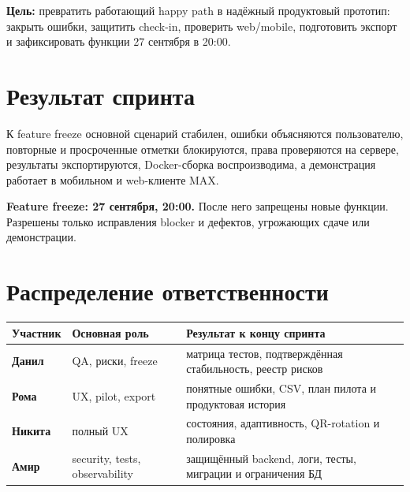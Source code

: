\documentclass[11pt,a4paper]{article}
\begin{document}
\begin{titlepage}\pagecolor{MaxPurple}\color{white}\par{}\par\vspace{9mm}{\Large 26-27 сентября 2026}\par\vfill
\begin{tcolorbox}[colback=white,colframe=white,arc=3mm,boxrule=0pt]\color{Ink}\textbf{Цель:} превратить работающий happy path в надёжный продуктовый прототип: закрыть ошибки, защитить check-in, проверить web/mobile, подготовить экспорт и зафиксировать функции 27 сентября в 20:00.\end{tcolorbox}\vspace{8mm}{\large Команда: Данил, Рома, Никита, Амир}\par\end{titlepage}\nopagecolor\color{Ink}

\section{Результат спринта}
\begin{goalbox}
К feature freeze основной сценарий стабилен, ошибки объясняются пользователю, повторные и просроченные отметки блокируются, права проверяются на сервере, результаты экспортируются, Docker-сборка воспроизводима, а демонстрация работает в мобильном и web-клиенте MAX.
\end{goalbox}
\begin{alertbox}\textbf{Feature freeze: 27 сентября, 20:00.} После него запрещены новые функции. Разрешены только исправления blocker и дефектов, угрожающих сдаче или демонстрации.\end{alertbox}

\section{Распределение ответственности}
\begin{tabularx}{\textwidth}{>{\bfseries}p{25mm}p{34mm}X}\toprule
Участник & Основная роль & Результат к концу спринта\\\midrule
Данил & QA, риски, freeze & матрица тестов, подтверждённая стабильность, реестр рисков\\
Рома & UX, pilot, export & понятные ошибки, CSV, план пилота и продуктовая история\\
Никита & полный UX & состояния, адаптивность, QR-rotation и полировка\\
Амир & security, tests, observability & защищённый backend, логи, тесты, миграции и ограничения БД\\\bottomrule
\end{tabularx}
\end{document}
